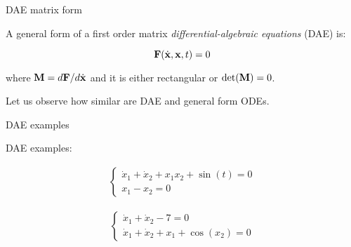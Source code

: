 \documentclass{beamer}
\begin{document}
\begin{frame}{DAE matrix form}
	\begin{flushleft}
		
		A general form of a first order matrix \emph{differential-algebraic equations} (DAE) is:
		
		\begin{equation}
			\mathbf{F}(\dot{\mathbf{x}}, \mathbf{x}, t) = 0
		\end{equation}
		
		where $\mathbf{M} = d\mathbf{F} / d\dot{\mathbf{x}}$ and it is either rectangular or $\text{det} (\mathbf{M}) = 0$.
		
		\bigskip
		
		\textcolor{mygrey}{
		Let us observe how similar are DAE and general form ODEs.}
		
	\end{flushleft}
\end{frame}



\begin{frame}{DAE examples}
	\begin{flushleft}
		
		DAE examples:
		
		\begin{align}
		\begin{cases}
						\dot x_1 + \dot x_2 + x_1 x_2 +  \sin(t) = 0\\
						x_1 - x_2 = 0
		\end{cases}
		\end{align}
		
		\begin{align}
			\begin{cases}
				\dot x_1 + \dot x_2 - 7 = 0\\
				\dot x_1 + \dot x_2 + x_1 + \cos(x_2) = 0
			\end{cases}
		\end{align}
		
		
	\end{flushleft}
\end{frame}
\end{document}
